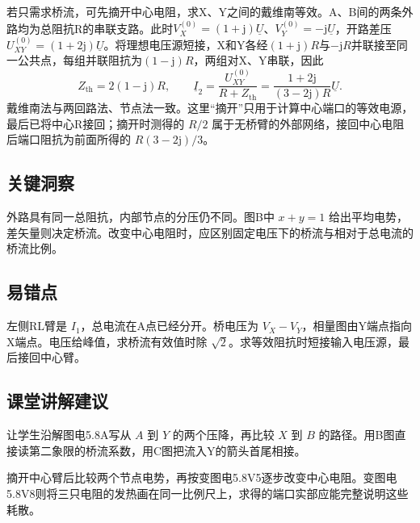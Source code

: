 \documentclass[UTF8,fontset=fandol,a4paper,11pt]{ctexart}
\begin{document}
若只需求桥流，可先摘开中心电阻，求X、Y之间的戴维南等效。A、B间的两条外路均为总阻抗R的串联支路。此时$V_X^{(0)}=(1+\mathrm j)\underline U$、$V_Y^{(0)}=-\mathrm j\underline U$，开路差压$U_{XY}^{(0)}=(1+2\mathrm j)\underline U$。将理想电压源短接，X和Y各经$(1+\mathrm j)R$与$-\mathrm jR$并联接至同一公共点，每组并联阻抗为$(1-\mathrm j)R$，两组对X、Y串联，因此
\[
Z_{\mathrm{th}}=2(1-\mathrm j)R,\qquad
\underline I_2=\frac{U_{XY}^{(0)}}{R+Z_{\mathrm{th}}}
=\frac{1+2\mathrm j}{(3-2\mathrm j)R}\underline U.
\]
戴维南法与两回路法、节点法一致。这里“摘开”只用于计算中心端口的等效电源，最后已将中心R接回；摘开时测得的 $R/2$ 属于无桥臂的外部网络，接回中心电阻后端口阻抗为前面所得的 $R(3-2\mathrm j)/3$。




\subsection*{关键洞察}

外路具有同一总阻抗，内部节点的分压仍不同。图B中 $x+y=1$ 给出平均电势，差矢量则决定桥流。改变中心电阻时，应区别固定电压下的桥流与相对于总电流的桥流比例。



\subsection*{易错点}

左侧RL臂是 $I_1$，总电流在A点已经分开。桥电压为 $V_X-V_Y$，相量图由Y端点指向X端点。电压给峰值，求桥流有效值时除 $\sqrt2$。求等效阻抗时短接输入电压源，最后接回中心臂。



\subsection*{课堂讲解建议}

让学生沿解图电5.8A写从 $A$ 到 $Y$ 的两个压降，再比较 $X$ 到 $B$ 的路径。用B图直接读第二象限的桥流系数，用C图把流入Y的箭头首尾相接。

摘开中心臂后比较两个节点电势，再按变图电5.8V5逐步改变中心电阻。变图电5.8V8则将三只电阻的发热画在同一比例尺上，求得的端口实部应能完整说明这些耗散。
\end{document}
